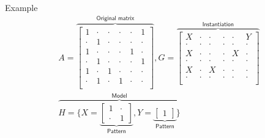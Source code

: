 \documentclass[11pt]{beamer}
\begin{document}
\begin{frame}{Example}
\begin{align*}
A =
\overbrace{
\begin{bmatrix}
1 & \cdot & \cdot & \cdot & \cdot & 1  \\[-.2em]
\cdot & 1 & \cdot & \cdot & \cdot & \cdot \\[-.2em]
1 & \cdot & \cdot & \cdot & 1 & \cdot  \\[-.2em]
\cdot & 1 & \cdot & \cdot & \cdot & 1  \\[-.2em]
1 & \cdot & 1 & \cdot & \cdot & \cdot  \\[-.2em]
\cdot & 1 & \cdot & 1 & \cdot & \cdot  \\
\end{bmatrix}}^{\textsf{Original matrix}},
G = 
\overbrace{
\begin{bmatrix}
X & \cdot & \cdot & \cdot & \cdot & Y  \\[-.2em]
\cdot & \cdot & \cdot & \cdot & \cdot & \cdot  \\[-.2em]
X & \cdot & \cdot & \cdot & X & \cdot  \\[-.2em]
\cdot & \cdot & \cdot & \cdot & \cdot & \cdot  \\[-.2em]
X & \cdot & X & \cdot & \cdot & \cdot  \\[-.2em]
\cdot & \cdot & \cdot & \cdot & \cdot & \cdot  \\
\end{bmatrix}}^{\textsf{Instantiation}}\\
\overbrace{
H = \{
X =
\underbrace{
\begin{bmatrix}
1 & \cdot \\[-.2em]
\cdot & 1
\end{bmatrix}}_{\textsf{Pattern}},
Y =
\underbrace{
\begin{bmatrix}
1
\end{bmatrix}}_{\textsf{Pattern}}
\}}^{\textsf{Model}}
\end{align*}
\end{frame}

\end{document}
